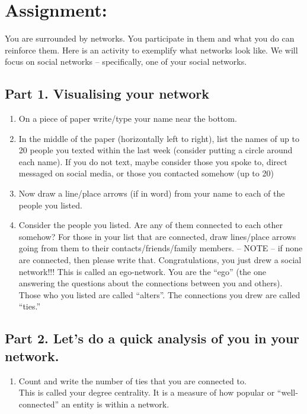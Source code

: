 \documentclass[
  letterpaper,
  DIV=11,
  numbers=noendperiod]{scrreprt}
\providecommand{\tightlist}{%
  \setlength{\itemsep}{0pt}\setlength{\parskip}{0pt}}\usepackage{longtable,booktabs,array}
\begin{document}
\section{Assignment:}\label{assignment}

You are surrounded by networks. You participate in them and what you do
can reinforce them. Here is an activity to exemplify what networks look
like. We will focus on social networks -- specifically, one of your
social networks.

\subsection{Part 1. Visualising your
network}\label{part-1.-visualising-your-network}

\begin{enumerate}
\def\labelenumi{\Alph{enumi}.}
\tightlist
\item
  On a piece of paper write/type your name near the bottom.
\item
  In the middle of the paper (horizontally left to right), list the
  names of up to 20 people you texted within the last week (consider
  putting a circle around each name). If you do not text, maybe consider
  those you spoke to, direct messaged on social media, or those you
  contacted somehow (up to 20)
\item
  Now draw a line/place arrows (if in word) from your name to each of
  the people you listed.
\item
  Consider the people you listed. Are any of them connected to each
  other somehow? For those in your list that are connected, draw
  lines/place arrows going from them to their contacts/friends/family
  members. -- NOTE -- if none are connected, then please write that.
  Congratulations, you just drew a social network!!! This is called an
  ego-network. You are the ``ego'' (the one answering the questions
  about the connections between you and others). Those who you listed
  are called ``alters''. The connections you drew are called ``ties.''
\end{enumerate}

\subsection{Part 2. Let's do a quick analysis of you in your
network.}\label{part-2.-lets-do-a-quick-analysis-of-you-in-your-network.}

\begin{enumerate}
\def\labelenumi{\Alph{enumi}.}
\tightlist
\item
  Count and write the number of ties that you are connected to.\\
  This is called your degree centrality. It is a measure of how popular
  or ``well-connected'' an entity is within a network.
\end{enumerate}
\end{document}
